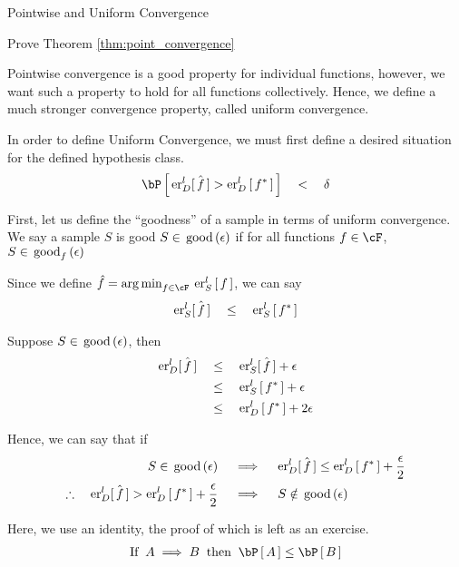 \documentclass{article}
\begin{document}
\begin{ssection}{Pointwise and Uniform Convergence}
	\begin{exercise}
		Prove Theorem \ref{thm:point_convergence}

	\end{exercise}

	Pointwise convergence is a good property for individual functions, however, we want such a property to hold for all functions collectively. Hence, we define a much stronger convergence property, called uniform convergence. \br

	In order to define Uniform Convergence, we must first define a desired situation for the defined hypothesis class.
	\begin{align*}
		\prob{\errs[_D^l]{f} > \err[_D^l]{f^\ast}}	\qlt	\delta
	\end{align*}

	First, let us define the ``goodness'' of a sample in terms of uniform convergence. We say a sample $S$ is good  $S \in \tfunc{good}{\epsilon}$ if for all functions $f \in \cF$, $S \in \tfunc[f]{good}{\epsilon}$ \br

	Since we define $\hat{f} = \argmin{f \in \cF} \err[_S^l]{f}$, we can say
	\begin{align*}
		\errs[_S^l]{f}	\qle	\err[_S^l]{f^\ast}
	\end{align*} \sbr

	Suppose $S \in \tfunc{good}{\epsilon}$, then
	\begin{align*}
		\errs[_D^l]{f}	&\qle	\errs[_S^l]{f} + \epsilon \\
						&\qle	\err[_S^l]{f^\ast} + \epsilon \\
						&\qle	\err[_D^l]{f^\ast} + 2 \epsilon \\
	\end{align*} \sbr

	Hence, we can say that if
	\begin{align*}
		S \in \tfunc{good}{\epsilon}	&\qimplies	\errs[_D^l]{f} \le	\err[_D^l]{f^\ast} + \frac{\epsilon}{2} \\
		\therefore \quad \errs[_D^l]{f} > \err[_D^l]{f^\ast} + \frac{\epsilon}{2}	&\qimplies S \notin \tfunc{good}{\epsilon}
	\end{align*} \sbr

	Here, we use an identity, the proof of which is left as an exercise.
	\begin{align*}
		\mt{If} \: A \implies B \: \qmt{then} \: \prob{A} \le \prob{B}
	\end{align*} \sbr


\end{ssection}
\end{document}
